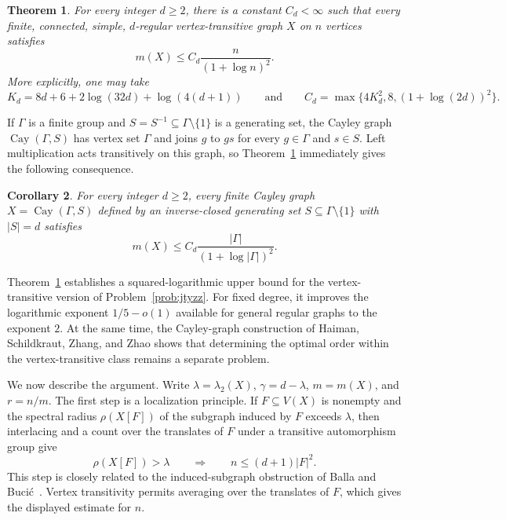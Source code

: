 \documentclass[11pt]{article}
\newtheorem{theorem}{Theorem}[section]
\newtheorem{corollary}[theorem]{Corollary}
\theoremstyle{definition}
\theoremstyle{remark}
\begin{document}
\begin{theorem}\label{thm:main}
For every integer $d\geq2$, there is a constant $C_d<\infty$ such that every finite, connected, simple, $d$-regular vertex-transitive graph $X$ on $n$ vertices satisfies
\[
m(X)\leq C_d\frac{n}{(1+\log n)^2}.
\]
More explicitly, one may take
\[
K_d=8d+6+2\log(32d)+\log(4(d+1))
\qquad\text{and}\qquad
C_d=\max\{4K_d^2,8,(1+\log(2d))^2\}.
\]
\end{theorem}

If $\Gamma$ is a finite group and $S=S^{-1}\subseteq\Gamma\setminus\{1\}$ is a generating set, the Cayley graph $\operatorname{Cay}(\Gamma,S)$ has vertex set $\Gamma$ and joins $g$ to $gs$ for every $g\in\Gamma$ and $s\in S$. Left multiplication acts transitively on this graph, so Theorem~\ref{thm:main} immediately gives the following consequence.

\begin{corollary}\label{cor:cayley}
For every integer $d\geq2$, every finite Cayley graph $X=\operatorname{Cay}(\Gamma,S)$ defined by an inverse-closed generating set $S\subseteq\Gamma\setminus\{1\}$ with $|S|=d$ satisfies
\[
m(X)\leq C_d\frac{|\Gamma|}{(1+\log|\Gamma|)^2}.
\]
\end{corollary}

Theorem~\ref{thm:main} establishes a squared-logarithmic upper bound for the vertex-transitive version of Problem~\ref{prob:jtyzz}. For fixed degree, it improves the logarithmic exponent $1/5-o(1)$ available for general regular graphs to the exponent $2$. At the same time, the Cayley-graph construction of Haiman, Schildkraut, Zhang, and Zhao shows that determining the optimal order within the vertex-transitive class remains a separate problem.

We now describe the argument. Write $\lambda=\lambda_2(X)$, $\gamma=d-\lambda$, $m=m(X)$, and $r=n/m$. The first step is a localization principle. If $F\subseteq V(X)$ is nonempty and the spectral radius $\rho(X[F])$ of the subgraph induced by $F$ exceeds $\lambda$, then interlacing and a count over the translates of $F$ under a transitive automorphism group give
\[
\rho(X[F])>\lambda
\qquad\Longrightarrow\qquad
n\leq(d+1)|F|^2.
\]
This step is closely related to the induced-subgraph obstruction of Balla and Buci\'c~\cite[Lemmas~2.2 and~2.3]{BallaBucic2024ImprovedMultiplicity}. Vertex transitivity permits averaging over the translates of $F$, which gives the displayed estimate for $n$.
\end{document}
